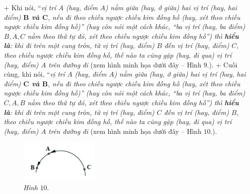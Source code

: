 	\vskip 0.1cm
	+ Khi nói, “\textit{vị trí $A$ (\textnormal{hay}, điểm $A$) nằm giữa (\textnormal{hay}, ở giữa) hai vị trí (\textnormal{hay}, hai điểm) \textbf{\color{toancuabi}$\pmb B$ và $\pmb C$}, nếu đi theo chiều ngược chiều kim đồng hồ (\textnormal{hay}, xét theo chiều ngược chiều kim đồng hồ)” (\textnormal{hay còn} nói một cách khác, “ba vị trí (\textnormal{hay}, ba điểm) $B, A, C$ nằm theo thứ tự đó, xét theo chiều ngược chiều kim đồng hồ”) thì \textbf{\color{toancuabi}hiểu là}: khi đi trên một cung tròn, từ vị trí (\textnormal{hay}, điểm) $B$ đến vị trí (\textnormal{hay}, điểm) $C$, theo chiều ngược chiều kim đồng hồ, thế nào ta cũng gặp (\textnormal{hay}, đi qua) vị trí (\textnormal{hay}, điểm) $A$ trên đường đi} (xem hình minh họa dưới đây -- Hình $9.$).
	\vskip 0.1cm
	+ Cuối cùng, khi nói, “\textit{vị trí $A$ (\textnormal{hay}, điểm $A$) nằm giữa (\textnormal{hay}, ở giữa) hai vị trí (\textnormal{hay}, hai điểm) \textbf{\color{toancuabi}$\pmb C$ và $\pmb B$}, nếu đi theo chiều ngược chiều kim đồng hồ (\textnormal{hay}, xét theo chiều ngược chiều kim đồng hồ)” (\textnormal{hay còn} nói một cách khác, “ba vị trí (\textnormal{hay}, ba điểm) $C, A, B$ nằm theo thứ tự đó, xét theo chiều ngược chiều kim đồng hồ”) thì \textbf{\color{toancuabi}hiểu là}: khi đi trên một cung tròn, từ vị trí (\textnormal{hay}, điểm) $C$ đến vị trí (\textnormal{hay}, điểm) $B$, theo chiều ngược chiều kim đồng hồ, thế nào ta cũng gặp (\textnormal{hay}, đi qua) vị trí (\textnormal{hay}, điểm) $A$ trên đường đi} (xem hình minh họa dưới đây -- Hình $10.$).
	\vskip 0.1cm
	\begin{figure}
		\centering
		\vspace*{-10pt}
		\captionsetup{labelformat= empty, justification=centering}
		\includegraphics[width=0.35\textwidth]{pic10}
		\caption{\small\textit{Hình $10.$}}
		\vspace*{-10pt}
	\end{figure}
